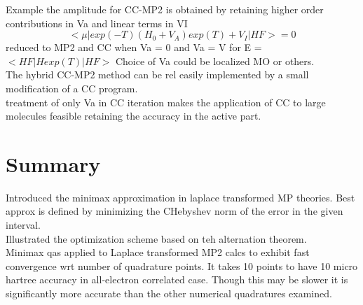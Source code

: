 \documentclass[10pt, draft]{article}
\begin{document}
Example the amplitude for CC-MP2 is obtained by retaining higher order contributions in Va and linear terms in VI
\[ <\mu| exp(-T)(H_0 + V_A) exp(T) + V_I|HF> = 0\]
reduced to MP2 and CC when Va = 0 and Va = V for E = $<HF| H exp(T)|HF>$ Choice of Va could be localized MO or others.  \\
The hybrid CC-MP2 method can be rel easily implemented by a small modification of a CC program.  \\
treatment of only Va in CC iteration makes the application of CC to large molecules feasible retaining the accuracy in the active part.  

\section{Summary}
Introduced the minimax approximation in laplace transformed MP theories.  Best approx is defined by minimizing the CHebyshev norm of the error in the given interval.  \\
Illustrated the optimization scheme based on teh alternation theorem.\\
Minimax qas applied to Laplace transformed MP2 calcs to exhibit fast convergence wrt number of quadrature points.  It takes 10 points to have 10 micro hartree accuracy in all-electron correlated case. Though this may be slower it is significantly more accurate than the other numerical quadratures examined.\\
\end{document}
